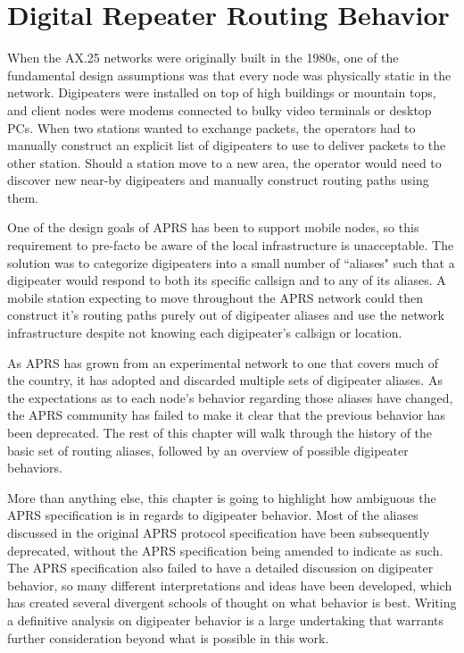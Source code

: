 \chapter{Digital Repeater Routing Behavior}

When the AX.25 networks were originally built in the 1980s,
one of the fundamental design assumptions was that every node was 
physically static in the network.
Digipeaters were installed on top of high buildings or mountain tops, 
and client nodes were modems connected to bulky video terminals or desktop PCs.
When two stations wanted to exchange packets,
the operators had to manually construct an explicit list of digipeaters to use
to deliver packets to the other station.
Should a station move to a new area, 
the operator would need to discover new near-by digipeaters and manually construct
routing paths using them.

One of the design goals of APRS has been to support mobile nodes,
so this requirement to pre-facto be aware of the
local infrastructure is unacceptable.
The solution was to categorize digipeaters into a small number of ``aliases"
such that a digipeater would respond to both its specific callsign
and to any of its aliases.
A mobile station expecting to move throughout the APRS network
could then construct it's routing paths purely out of digipeater aliases
and use the network infrastructure despite not knowing
each digipeater's callsign or location.

As APRS has grown from an experimental network
to one that covers much of the country,
it has adopted and discarded multiple sets of digipeater aliases.
As the expectations as to each node's behavior regarding those aliases have changed,
the APRS community has failed to make it clear that
the previous behavior has been deprecated.
The rest of this chapter will walk through the history
of the basic set of routing aliases,
followed by an overview of possible digipeater behaviors.

More than anything else, this chapter is going to highlight
how ambiguous the APRS specification is in regards to digipeater behavior.
Most of the aliases discussed in the original APRS protocol specification
have been subsequently deprecated,
without the APRS specification being amended to indicate as such.
The APRS specification also failed to have a detailed discussion
on digipeater behavior,
so many different interpretations and ideas have been developed, which has
created several divergent schools of thought on what behavior is best.
Writing a definitive analysis on digipeater behavior is a large undertaking
that warrants further consideration beyond what is possible in this work.

